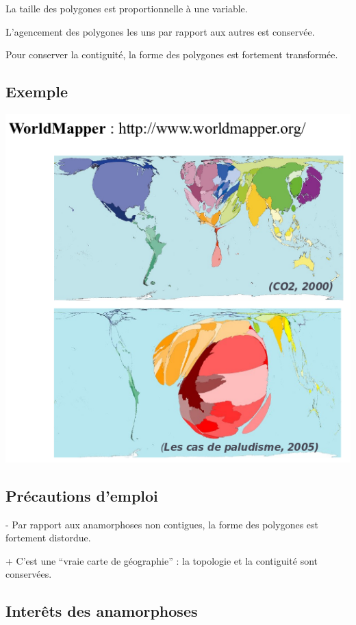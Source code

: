 \documentclass[]{book}
\begin{document}
La taille des polygones est proportionnelle à une variable.

L'agencement des polygones les uns par rapport aux autres est conservée.

Pour conserver la contiguité, la forme des polygones est fortement transformée.

\hypertarget{exemple-2}{%
\subsection{Exemple}\label{exemple-2}}

\includegraphics{img/c.png}

\hypertarget{precautions-demploi-2}{%
\subsection{Précautions d'emploi}\label{precautions-demploi-2}}

- Par rapport aux anamorphoses non contigues, la forme des polygones est fortement distordue.

+ C'est une ``vraie carte de géographie'' : la topologie et la contiguité sont conservées.

\hypertarget{interets-des-anamorphoses}{%
\subsection{Interêts des anamorphoses}\label{interets-des-anamorphoses}}
\end{document}
